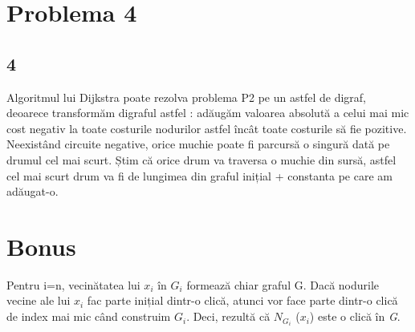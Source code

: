 \documentclass[12pt] {fphw}
\begin{document}
\section*{Problema 4}
\subsection*{4}
Algoritmul lui Dijkstra poate rezolva problema P2 pe un astfel de digraf, deoarece transformăm digraful astfel : adăugăm valoarea absolută a celui mai mic cost negativ la toate costurile nodurilor astfel încât toate costurile să fie pozitive. Neexistând circuite negative, orice muchie poate fi parcursă o singură dată pe drumul cel mai scurt. Știm că orice drum va traversa o muchie din sursă, astfel cel mai scurt drum va fi de lungimea din graful inițial + constanta pe care am adăugat-o.  

\section*{Bonus}
Pentru i=n, vecinătatea lui {$x_i$} în {$G_i$} formează chiar graful G. Dacă nodurile vecine ale lui  {$x_i$} fac parte inițial dintr-o clică, atunci vor face parte dintr-o clică de index mai mic când construim {$G_i$}. Deci, rezultă că {$N_{G_i}$}
({$x_i$}) este o clică în \textit{G}. 
 
\end{document}
